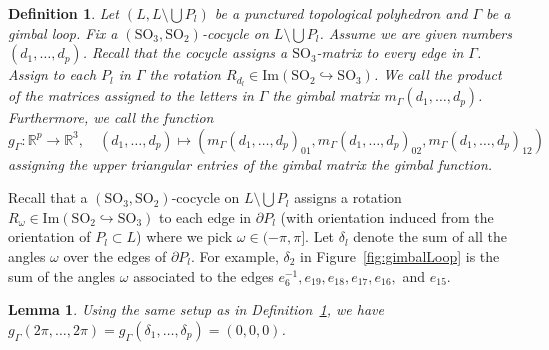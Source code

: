 \documentclass[utopia,fullpage]{nmd/article}
\newcommand\R{\mathbb R}
\newtheorem{lemma}[theorem]{Lemma}
\newtheorem{definition}[theorem]{Definition}
\newcommand\mySO[1]{\mathrm{SO}_{#1}}
\newcommand\myPath{\Gamma}
\begin{document}
\begin{definition} \label{def:defGimbalFunction}
Let $(L,L\setminus \bigcup P_l)$ be a punctured topological polyhedron and $\myPath$ be a gimbal loop. Fix a $(\mySO{3},\mySO{2})$-cocycle on $L\setminus \bigcup P_l$. Assume we are given numbers $(d_1,\dots,d_p)$. Recall that the cocycle assigns a $\mySO{3}$-matrix to every edge in $\myPath$. Assign to each $P_l$ in $\myPath$ the rotation $R_{d_l}\in\mathrm{Im}(\mySO{2}\hookrightarrow\mySO{3})$. We call the product of the matrices assigned to the letters in $\myPath$ the gimbal matrix $m_\myPath(d_1,\dots,d_p)$. Furthermore, we call the function
$$g_\myPath:\R^p\to\R^3,\quad (d_1,\dots, d_p)\mapsto\left(m_\myPath(d_1,\dots,d_p)_{01},m_\myPath(d_1,\dots,d_p)_{02},m_\myPath(d_1,\dots,d_p)_{12}\right)$$
assigning the upper triangular entries of the gimbal matrix the gimbal function.
\end{definition}

Recall that a $(\mySO{3},\mySO{2})$-cocycle on $L\setminus \bigcup P_l$ assigns a rotation $R_\omega\in\mathrm{Im}(\mySO{2}\hookrightarrow\mySO{3})$ to each edge in $\partial P_l$ (with orientation induced from the orientation of $P_l\subset L$) where we pick $\omega\in(-\pi,\pi]$. Let $\delta_l$ denote the sum of all the angles $\omega$ over the edges of $\partial P_l$. For example, $\delta_2$ in Figure~\ref{fig:gimbalLoop} is the sum of the angles $\omega$ associated to the edges $e^{-1}_{6}, e_{19}, e_{18}, e_{17}, e_{16},$ and $e_{15}.$

\begin{lemma}
Using the same setup as in Definition~\ref{def:defGimbalFunction}, we have
$g_\myPath(2\pi,\dots,2\pi)=g_\myPath(\delta_1,\dots,\delta_p)=(0,0,0)$. \label{lemma:gimbalMatrixId}
\end{lemma}
\end{document}
